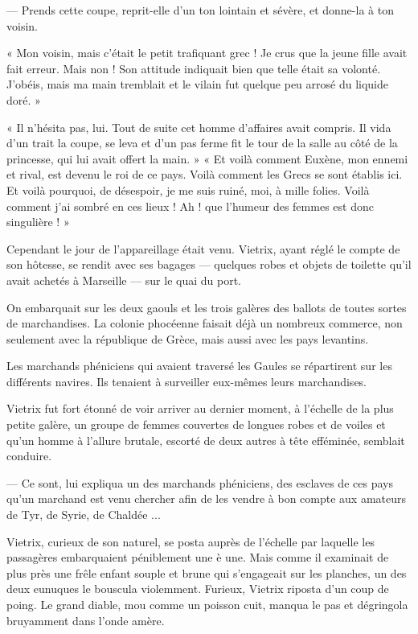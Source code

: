 \documentclass[a4paper, 11pt, oneside, polutonikogreek, french]{article}
\begin{document}
--- Prends cette coupe, reprit-elle d'un ton lointain et sévère, et donne-la à ton voisin.

« Mon voisin, mais c'était le petit trafiquant grec ! Je crus que la jeune fille avait fait erreur. Mais non ! Son attitude indiquait bien que telle était sa volonté. J'obéis, mais ma main tremblait et le vilain fut quelque peu arrosé du liquide doré. »

« Il n'hésita pas, lui. Tout de suite cet homme d'affaires avait compris. Il vida d'un trait la coupe, se leva et d'un pas ferme fit le tour de la salle au côté de la princesse, qui lui avait offert la main. »
 «  Et voilà comment Euxène, mon ennemi et rival, est devenu le roi de ce pays. Voilà comment les Grecs se sont établis ici. Et voilà pourquoi, de désespoir, je me suis ruiné, moi, à mille folies. Voilà comment j'ai sombré en ces lieux ! Ah ! que l'humeur des femmes est donc singulière ! »

\bigskip
\centerline{\EightStarTaper}
\centerline{\EightStarTaper\EightStarTaper}
\bigskip

Cependant le jour de l'appareillage était venu. Vietrix, ayant réglé le compte de son hôtesse, se rendit avec ses bagages --- quelques robes et objets de toilette qu'il avait achetés à Marseille --- sur le quai du port.

On embarquait sur les deux gaouls et les trois galères des ballots de toutes sortes de marchandises. La colonie phocéenne faisait déjà un nombreux commerce, non seulement avec la république de Grèce, mais aussi avec les pays levantins.

Les marchands phéniciens qui avaient traversé les Gaules se répartirent sur les différents navires. Ils tenaient à surveiller eux-mêmes leurs marchandises.

Vietrix fut fort étonné de voir arriver au dernier moment, à l'échelle de la plus petite galère, un groupe de femmes couvertes de longues robes et de voiles et qu'un homme à l'allure brutale, escorté de deux autres à tête efféminée, semblait conduire.

--- Ce sont, lui expliqua un des marchands phéniciens, des esclaves de ces pays qu'un marchand est venu chercher afin de les vendre à bon compte aux amateurs de Tyr, de Syrie, de Chaldée ...

Vietrix, curieux de son naturel, se posta auprès de l'échelle par laquelle les passagères embarquaient péniblement une è une. Mais comme il examinait de plus près une frêle enfant souple et brune qui s'engageait sur les planches, un des deux eunuques le bouscula violemment. Furieux, Vietrix riposta d'un coup de poing. Le grand diable, mou comme un poisson cuit, manqua le pas et dégringola bruyamment dans l'onde amère.
\end{document}
